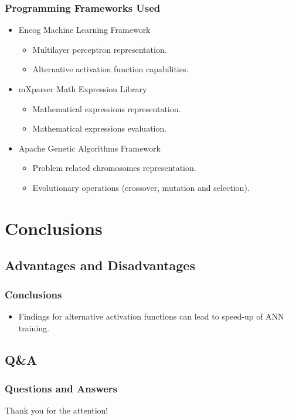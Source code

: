 \documentclass{beamer}
\begin{document}
\begin{frame}
\frametitle{Programming Frameworks Used}
\begin{itemize}
  \item Encog Machine Learning Framework
  \begin{itemize}
    \item Multilayer perceptron representation.
    \item Alternative activation function capabilities.
  \end{itemize}
  \item mXparser Math Expression Library
  \begin{itemize}
    \item Mathematical expressions representation.
    \item Mathematical expressions evaluation.
  \end{itemize}
  \item Apache Genetic Algorithms Framework
  \begin{itemize}
    \item Problem related chromosomes representation.
    \item Evolutionary operations (crossover, mutation and selection).
  \end{itemize}
\end{itemize}
\end{frame}

\section{Conclusions}

\subsection{Advantages and Disadvantages}

\begin{frame}
\frametitle{Conclusions}
\begin{itemize}
  \item Findings for alternative activation functions can lead to speed-up of ANN training.
\end{itemize}
\end{frame}

\subsection{Q\&A}

\begin{frame}
\frametitle{Questions and Answers}
\center \huge{Thank you for the attention!}
\end{frame}
\end{document}
